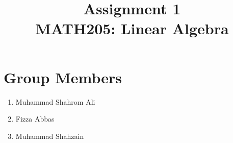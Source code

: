 \documentclass[a4paper, 11pt]{article}
\title{Assignment 1 \\ MATH205: Linear Algebra}
\author{}
\begin{document}
\setlength{\parskip}{10pt}
\setlength{\parindent}{0pt}
\maketitle

\section{Group Members}
\begin{enumerate}
	\item Muhammad Shahrom Ali
	\item Fizza Abbas 
	\item Muhammad Shahzain
\end{enumerate}

\newpage
\end{document}
